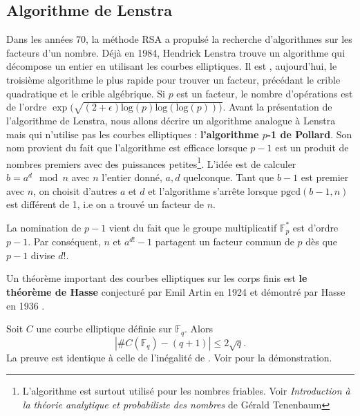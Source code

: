 \documentclass[a4paper]{article}
\begin{document}
\subsection{Algorithme de Lenstra}
\noindent Dans les années 70, la méthode RSA a propulsé la recherche d'algorithmes sur les facteurs d'un nombre. Déjà en 1984, Hendrick Lenstra \cite{ref9} trouve un algorithme qui décompose un entier en utilisant les courbes elliptiques. Il est , aujourd'hui, le troisième algorithme le plus rapide pour trouver un facteur, précédant le crible quadratique et le crible algébrique. Si $p$ est un facteur, le nombre d'opérations est de l'ordre $\exp(\sqrt{(2+\epsilon)\text{log}(p)\text{log}(\text{log}(p)))}$.
Avant la présentation de l'algorithme de Lenstra, nous allons décrire un algorithme analogue à Lenstra mais qui n'utilise pas les courbes elliptiques : \textbf{l'algorithme $p$-1 de Pollard}.
Son nom provient du fait que l'algorithme est efficace lorsque $p-1$ est un produit de nombres premiers avec des puissances petites\footnote{L'algorithme est surtout utilisé pour les nombres friables. Voir \textit{Introduction à la théorie analytique et probabiliste des nombres} de Gérald Tenenbaum}.
L'idée est de calculer $b=a^d \mod n$ avec $n$ l'entier donné, $a,d$ quelconque.
Tant que $b-1$ est premier avec $n$, on choisit d'autres $a$ et $d$ et l'algorithme s'arrête lorsque $\text{pgcd}(b-1,n)$ est différent de 1, i.e on a trouvé un facteur de $n$. \\
\begin{rem}La nomination de $p-1$ vient du fait que le groupe multiplicatif $\mathbb{F}_{p}^*$ est d'ordre $p-1$. Par conséquent, $n$ et $a^{d!}-1$ partagent un facteur commun de $p$ dès que $p-1$ divise $d!$.
\end{rem}
\noindent Un théorème important des courbes elliptiques sur les corps finis est \textbf{le théorème de Hasse} conjecturé par Emil Artin en 1924 et démontré par Hasse en 1936 \cite{ref15}.


\begin{theorem}[Hasse] \label{has}
Soit $C$ une courbe elliptique définie sur $\mathbb{F}_{q}$. Alors 
\begin{equation*}
|\#C(\mathbb{F}_{q})-(q+1)| \leqslant 2\sqrt{q}.
\end{equation*}
La preuve est identique à celle de l'inégalité de . Voir \cite{ref2} pour la démonstration.
\end{theorem}
\end{document}
